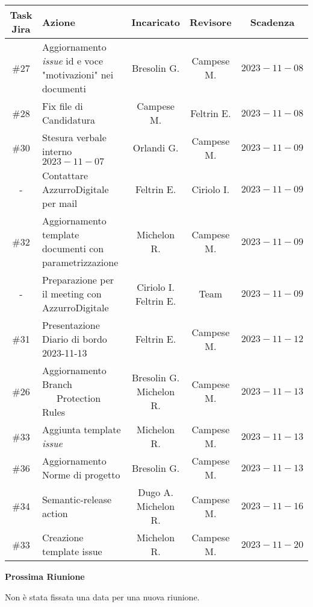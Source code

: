 \documentclass[10pt, a4paper]{article}
\begin{document}
{\renewcommand{\arraystretch}{1.5}
\begin{tabularx}{\textwidth}{c|X|c|c|c}
\textbf{Task Jira} & \textbf{Azione} & \textbf{Incaricato} & \textbf{Revisore} & \textbf{Scadenza} \\
\hline 
\#27 & Aggiornamento \textit{issue} id e voce "motivazioni" nei documenti  & Bresolin G. & Campese M. & $2023-11-08$ \\
\hline
\#28 & Fix file di Candidatura & Campese M. & Feltrin E. & $2023-11-08$ \\
\hline
\#30 & Stesura verbale interno $2023-11-07$ & Orlandi G. & Campese M. & $2023-11-09$ \\
\hline 
- & Contattare AzzurroDigitale per mail & Feltrin E. & Ciriolo I. & $2023-11-09$ \\
\hline
\#32 & Aggiornamento template documenti con parametrizzazione  &  Michelon R. & Campese M. & $2023-11-09$ \\
\hline
- & Preparazione per il meeting con AzzurroDigitale  & \quantities{Ciriolo I.\\Feltrin E.} & Team & $2023-11-09$ \\
\hline
\#31 & Presentazione Diario di bordo 2023-11-13 & Feltrin E. & Campese M. & $2023-11-12$ \\
\hline
\#26 & Aggiornamento Branch \ \ \  Protection Rules & \quantities{Bresolin G. \\Michelon R.} & Campese M. & $2023-11-13$ \\
\hline
\#33 & Aggiunta template \textit{issue} & Michelon R. & Campese M. & $2023-11-13$ \\
\hline
\#36 & Aggiornamento Norme di progetto & Bresolin G. & Campese M. & $2023-11-13$ \\
\hline
\#34 & Semantic-release action & \quantities{Dugo A. \\ Michelon R.} & Campese M. & $2023-11-16$ \\
\hline
\#33 & Creazione template issue & Michelon R. & Campese M. & $2023-11-20$\\
\end{tabularx}}



\vspace{3em}


\textbf{Prossima Riunione}

Non è stata fissata una data per una nuova riunione.
\end{document}
